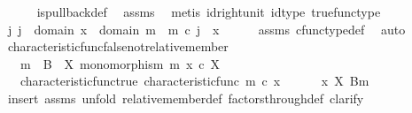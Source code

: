 \begin{isabellebody}
\ \ \ \ \isamarkupfalse%
\ is{\isacharunderscore}{\kern0pt}pullback{\isacharunderscore}{\kern0pt}def\ \isamarkupfalse%
\ assms\ \isamarkupfalse%
\ {\isacharparenleft}{\kern0pt}metis\ id{\isacharunderscore}{\kern0pt}right{\isacharunderscore}{\kern0pt}unit{}\ id{\isacharunderscore}{\kern0pt}type\ true{\isacharunderscore}{\kern0pt}func{\isacharunderscore}{\kern0pt}type{\isacharparenright}{\kern0pt}\isanewline
\ \ \isamarkupfalse%
\ \isamarkupfalse%
\ {\isachardoublequoteopen}{\isasymexists}j{\isachardot}{\kern0pt}\ j\ {\isacharcolon}{\kern0pt}\ domain\ x\ {\isasymrightarrow}\ domain\ m\ {\isasymand}\ m\ {\isasymcirc}\isactrlsub c\ j\ {\isacharequal}{\kern0pt}\ x{\isachardoublequoteclose}\isanewline
\ \ \ \ \isamarkupfalse%
\ assms{\isacharparenleft}{\kern0pt}{}{\isacharcomma}{\kern0pt}{}{\isacharparenright}{\kern0pt}\ cfunc{\isacharunderscore}{\kern0pt}type{\isacharunderscore}{\kern0pt}def\ \isamarkupfalse%
\ auto\isanewline
{}\isamarkupfalse%
%
\endisatagproof
{\isafoldproof}%
%
\isadelimproof
\isanewline
%
\endisadelimproof
\isanewline
{}\isamarkupfalse%
\ characteristic{\isacharunderscore}{\kern0pt}func{\isacharunderscore}{\kern0pt}false{\isacharunderscore}{\kern0pt}not{\isacharunderscore}{\kern0pt}relative{\isacharunderscore}{\kern0pt}member{\isacharcolon}{\kern0pt}\isanewline
\ \ \ {\isachardoublequoteopen}m\ {\isacharcolon}{\kern0pt}\ B\ {\isasymrightarrow}\ X{\isachardoublequoteclose}\ {\isachardoublequoteopen}monomorphism\ m{\isachardoublequoteclose}\ {\isachardoublequoteopen}x\ {\isasymin}\isactrlsub c\ X{\isachardoublequoteclose}\isanewline
\ \ \ characteristic{\isacharunderscore}{\kern0pt}func{\isacharunderscore}{\kern0pt}true{\isacharcolon}{\kern0pt}\ {\isachardoublequoteopen}characteristic{\isacharunderscore}{\kern0pt}func\ m\ {\isasymcirc}\isactrlsub c\ x\ {\isacharequal}{\kern0pt}\ {\isasymf}{\isachardoublequoteclose}\isanewline
\ \ \ {\isachardoublequoteopen}{\isasymnot}\ {\isacharparenleft}{\kern0pt}x\ {\isasymin}\isactrlbsub X\isactrlesub \ {\isacharparenleft}{\kern0pt}B{\isacharcomma}{\kern0pt}m{\isacharparenright}{\kern0pt}{\isacharparenright}{\kern0pt}{\isachardoublequoteclose}\isanewline
%
\isadelimproof
%
\endisadelimproof
%
\isatagproof
{}\isamarkupfalse%
\ {\isacharparenleft}{\kern0pt}insert\ assms{\isacharcomma}{\kern0pt}\ unfold\ relative{\isacharunderscore}{\kern0pt}member{\isacharunderscore}{\kern0pt}def{}\ factors{\isacharunderscore}{\kern0pt}through{\isacharunderscore}{\kern0pt}def{\isacharcomma}{\kern0pt}\ clarify{\isacharparenright}{\kern0pt}\isanewline

\end{isabellebody}
